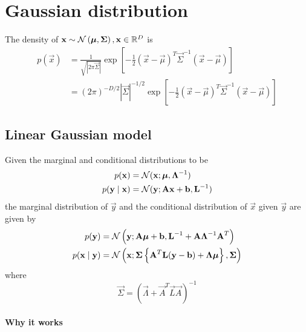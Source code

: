 \section{Gaussian distribution}
The density of $\boldsymbol{\mathbf{x}} \sim \operatorname{\mathcal N}\left(\boldsymbol{\mathbf{\mu}}, \boldsymbol{\mathbf{\Sigma}}\right), \boldsymbol{\mathbf{x}} \in \mathbb R^D$ is
\begin{align}
    p(\vec x)   &= \frac{1}{\sqrt{|2\pi\vec \Sigma|}} \exp{\left[-\frac{1}{2}(\vec x - \vec \mu)^T \vec \Sigma^{-1} (\vec x - \vec \mu)\right]} \\
                &= (2\pi)^{-D / 2} |\vec \Sigma|^{-1 / 2} \exp{\left[-\frac{1}{2}(\vec x - \vec \mu)^T \vec \Sigma^{-1} (\vec x - \vec \mu)\right]}
\end{align}
\subsection{Linear Gaussian model}
\label{ssec:prob-gaussian-lingauss}
Given the marginal and conditional distributions to be
\begin{align}
    p(\boldsymbol{\mathbf{x}})               &= \operatorname{\mathcal N}(\boldsymbol{\mathbf{x}}; \boldsymbol{\mathbf{\mu}}, \boldsymbol{\mathbf{\Lambda}}^{-1}) \label{eqn:prob-gaussian-lingauss1} \\
    p(\boldsymbol{\mathbf{y}} \mid \boldsymbol{\mathbf{x}})   &= \operatorname{\mathcal N}(\boldsymbol{\mathbf{y}}; \boldsymbol{\mathbf{A}} \boldsymbol{\mathbf{x}} + \boldsymbol{\mathbf{b}}, \boldsymbol{\mathbf{L}}^{-1}) \label{eqn:prob-gaussian-lingauss2}
\end{align}
the marginal distribution of $\vec y$ and the conditional distribution of $\vec x$ given $\vec y$ are given by
\begin{align}
    p(\boldsymbol{\mathbf{y}})               &= \operatorname{\mathcal N}\left(\boldsymbol{\mathbf{y}}; \boldsymbol{\mathbf{A}} \boldsymbol{\mathbf{\mu}} + \boldsymbol{\mathbf{b}}, \boldsymbol{\mathbf{L}}^{-1} + \boldsymbol{\mathbf{A}} \boldsymbol{\mathbf{\Lambda}}^{-1} \boldsymbol{\mathbf{A}}^T\right) \label{eqn:prob-gaussian-lingauss3}\\
    p(\boldsymbol{\mathbf{x}} \mid \boldsymbol{\mathbf{y}})   &= \operatorname{\mathcal N}\left(\boldsymbol{\mathbf{x}}; \boldsymbol{\mathbf{\Sigma}}\left\{\boldsymbol{\mathbf{A}}^T \boldsymbol{\mathbf{L}}(\boldsymbol{\mathbf{y}} - \boldsymbol{\mathbf{b}}) + \boldsymbol{\mathbf{\Lambda}} \boldsymbol{\mathbf{\mu}}\right\}, \boldsymbol{\mathbf{\Sigma}}\right) \label{eqn:prob-gaussian-lingauss4}
\end{align}
where
\begin{equation}
    \vec \Sigma = \left(\vec \Lambda + \vec A^T \vec L \vec A \right)^{-1} \label{eqn:prob-gaussian-lingauss5}
\end{equation}

\paragraph{Why it works}